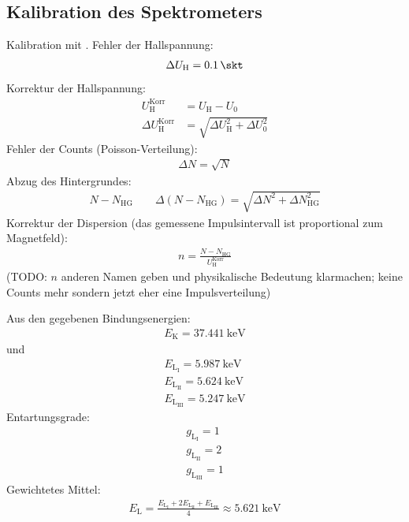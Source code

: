 \documentclass[11pt, a4paper]{article}
\numberwithin{equation}{section}
\begin{document}
\subsection{Kalibration des Spektrometers}
Kalibration mit .
Fehler der Hallspannung:
\begin{align}
	\Delta U_\mathrm{H} = \SI{0.1}{\skt}
\end{align}
Korrektur der Hallspannung:
\begin{align}
	U_\mathrm{H}^\mathrm{Korr} &= U_\mathrm{H} - U_0 \\
	\Delta U_\mathrm{H}^\mathrm{Korr} &= \sqrt{\Delta U_\mathrm{H}^2 + \Delta U_0^2}
\end{align}
Fehler der Counts (Poisson-Verteilung):
\begin{align}
	\Delta N = \sqrt{N}
\end{align}
Abzug des Hintergrundes:
\begin{align}
	N - N_\mathrm{HG} \qquad \Delta(N - N_\mathrm{HG}) = \sqrt{\Delta N^2 + \Delta N_\mathrm{HG}^2}
\end{align}
Korrektur der Dispersion (das gemessene Impulsintervall ist proportional zum Magnetfeld):
\begin{align}
	n = \frac{N-N_\mathrm{HG}}{U_\mathrm{H}^\mathrm{Korr}}
\end{align}
(TODO: $n$ anderen Namen geben und physikalische Bedeutung klarmachen; keine Counts mehr sondern jetzt eher eine Impulsverteilung)

Aus den gegebenen Bindungsenergien:
\begin{align*}
	E_\mathrm{K} = \SI{37,441}{\kilo\electronvolt}
\end{align*}
und
\begin{align*}
	E_{\mathrm{L}_{\mathrm{I}}} = \SI{5,987}{\kilo\electronvolt} \\
	E_{\mathrm{L}_{\mathrm{II}}} = \SI{5,624}{\kilo\electronvolt} \\
	E_{\mathrm{L}_{\mathrm{III}}} = \SI{5,247}{\kilo\electronvolt}
\end{align*}
Entartungsgrade:
\begin{align*}
	g_{\mathrm{L}_{\mathrm{I}}} = \num{1} \\
	g_{\mathrm{L}_{\mathrm{II}}} = \num{2} \\
	g_{\mathrm{L}_{\mathrm{III}}} = \num{1}
\end{align*}
Gewichtetes Mittel:
\begin{align}
	E_\mathrm{L} = \frac{E_{\mathrm{L}_{\mathrm{I}}} + 2E_{\mathrm{L}_{\mathrm{II}}} + E_{\mathrm{L}_{\mathrm{III}}}}{4} \approx \SI{5,621}{\kilo\electronvolt}
\end{align}
\end{document}
